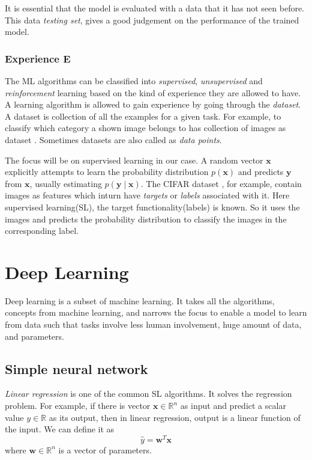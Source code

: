 It is essential that the model is evaluated with a data that it has not seen before. This data
\textit{testing set}, gives a good judgement on the performance  of the trained model.

\subsubsection*{Experience E}
The ML algorithms can be classified into \textit{supervised}, \textit{unsupervised} and
\textit{reinforcement} learning based on the kind of experience they are allowed to have.
A learning algorithm is allowed to gain experience by going through the \textit{dataset}.
A dataset is collection of all the examples for a given task. For example, to classify
which category a shown image belongs to has collection of images as dataset
\cite{cifar10}. Sometimes datasets are also called as \textit{data points}.

The focus will be on supervised learning in our case.  A random vector $\mathbf{x}$ explicitly attempts to
learn the probability distribution $p(\mathbf{x})$ and predicts $\mathbf{y}$ from
$\mathbf{x}$, usually estimating $p(\mathbf{y}\mid\mathbf{x})$. The CIFAR
dataset \cite{cifar10}, for example, contain images as features which inturn have \textit{targets} or
\textit{labels} associated with it. Here supervised learning(SL), the target
functionality(labels) is known. So it uses the images and predicts the probability
distribution to classify the images in the corresponding label.

\section{Deep Learning}
Deep learning is a subset of machine learning. It takes all the algorithms, concepts from
 machine learning, and narrows the focus to enable a model to learn from data such that tasks
involve less human involvement, huge amount of data, and parameters.


\subsection{Simple neural network}
\textit{Linear regression} is one of the common SL algorithms. It solves the regression
problem. For example, if there is vector $\mathbf{x} \in \mathbb{R}^n$ as input and
predict a scalar value $y \in \mathbb{R}$ as its output, then in linear regression, output
is a linear function of the input. We can define it as
\begin{equation}
    \hat y = \mathbf{w}^T\mathbf{x}
    \label{eq:linear equation}
\end{equation}
where $\mathbf{w} \in \mathbb{R}^n$ is a vector of parameters.

